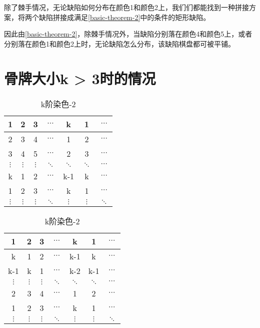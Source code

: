 除了棘手情况，无论缺陷如何分布在颜色1和颜色2上，我们们都能找到一种拼接方案，将两个缺陷拼接成满足\ref*{basic-theorem-2}中的条件的矩形缺陷。

因此由\ref*{basic-theorem-2}，除棘手情况外，当缺陷分别落在颜色4和颜色5上，或者分别落在颜色1和颜色2上时，无论缺陷怎么分布，该缺陷棋盘都可被平铺。

\section{骨牌大小k > 3时的情况}

\begin{table}[htbp]
	\caption{k阶染色}
	\label{fig:k-order-staining}
	\begin{subtable}{.5\linewidth}
		\centering
		\caption{k阶染色-1}
		\begin{tabular}{|c|c|c|c|c|c|c|}
			\hline
			1        & 2        & 3        & $\cdots$ & k        & 1        & $\cdots$ \\
			\hline
			2        & 3        & 4        & $\cdots$ & 1        & 2        & $\cdots$ \\
			\hline
			3        & 4        & 5        & $\cdots$ & 2        & 3        & $\cdots$ \\
			\hline
			$\vdots$ & $\vdots$ & $\vdots$ & $\ddots$ & $\ddots$ & $\ddots$ & $\cdots$ \\
			\hline
			k        & 1        & 2        & $\cdots$ & k-1      & k        & $\cdots$ \\
			\hline
			1        & 2        & 3        & $\cdots$ & k        & 1        & $\cdots$ \\
			\hline
			$\vdots$ & $\vdots$ & $\vdots$ & $\ddots$ & $\vdots$ & $\vdots$ & $\ddots$ \\
			\hline
		\end{tabular}
		\label{fig:k-order-staining-1}
	\end{subtable}%
	\begin{subtable}{.5\linewidth}
		\centering
		\caption{k阶染色-2}
		\begin{tabular}{|c|c|c|c|c|c|c|}
			\hline
			1        & 2        & 3        & $\cdots$ & k        & 1        & $\cdots$ \\
			\hline
			k        & 1        & 2        & $\cdots$ & k-1      & k        & $\cdots$ \\
			\hline
			k-1      & k        & 1        & $\cdots$ & k-2      & k-1      & $\cdots$ \\
			\hline
			$\vdots$ & $\vdots$ & $\vdots$ & $\ddots$ & $\ddots$ & $\ddots$ & $\cdots$ \\
			\hline
			2        & 3        & 4        & $\cdots$ & 1        & 2        & $\cdots$ \\
			\hline
			1        & 2        & 3        & $\cdots$ & k        & 1        & $\cdots$ \\
			\hline
			$\vdots$ & $\vdots$ & $\vdots$ & $\ddots$ & $\vdots$ & $\vdots$ & $\ddots$ \\
			\hline
		\end{tabular}
		\label{fig:k-order-staining-2}
	\end{subtable}
\end{table}

